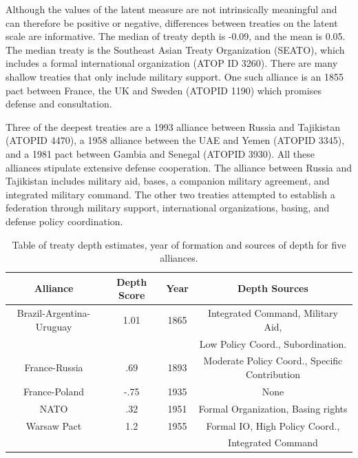 \documentclass[12pt]{article}
\begin{document}
Although the values of the latent measure are not intrinsically meaningful and can therefore be positive or negative, differences between treaties on the latent scale are informative. 
The median of treaty depth is -0.09, and the mean is 0.05. 
The median treaty is the Southeast Asian Treaty Organization (SEATO), which includes a formal international organization (ATOP ID 3260). 
There are many shallow treaties that only include military support. 
One such alliance is an 1855 pact between France, the UK and Sweden (ATOPID 1190) which promises defense and consultation. 


Three of the deepest treaties are a 1993 alliance between Russia and Tajikistan (ATOPID 4470), a 1958 alliance between the UAE and Yemen (ATOPID 3345), and a 1981 pact between Gambia and Senegal (ATOPID 3930). 
All these alliances stipulate extensive defense cooperation. 
The alliance between Russia and Tajikistan includes military aid, bases, a companion military agreement, and integrated military command. 
The other two treaties attempted to establish a federation through military support, international organizations, basing, and defense policy coordination.


\begin{table}[hbt!]
\begin{center}
\begin{tabular}{cccc}
   Alliance  & Depth Score & Year & Depth Sources  \\
\hline
Brazil-Argentina-Uruguay & 1.01 & 1865 & Integrated Command, Military Aid, \\
                         &      &      &  Low Policy Coord., Subordination. \\
France-Russia   & .69 & 1893 & Moderate Policy Coord., Specific Contribution \\
 France-Poland   & -.75  & 1935  & None\\
 NATO & .32 & 1951 & Formal Organization, Basing rights \\ 
 Warsaw Pact & 1.2  & 1955 &  Formal IO, High Policy Coord., \\
             &      &      & Integrated Command  \\ 
\hline
\end{tabular}
\caption{Table of treaty depth estimates, year of formation and sources of depth for five alliances. }
\label{tab:depth-tab}
\end{center} 
\end{table}
\end{document}
